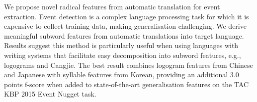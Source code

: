We propose novel radical features from automatic translation for event extraction. Event detection is a complex language processing task for which it is expensive to collect training data, making generalisation challenging. We derive meaningful subword features from automatic translations into target language. Results suggest this method is particularly useful when using languages with writing systems that facilitate easy decomposition into subword features, e.g., logograms and Cangjie. The best result combines logogram features from Chinese and Japanese with syllable features from Korean, providing an additional 3.0 points f-score when added to state-of-the-art generalisation features on the TAC KBP 2015 Event Nugget task.
